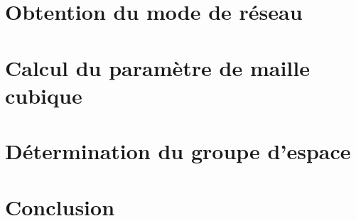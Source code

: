 \section{Obtention du mode de réseau}

\section{Calcul du paramètre de maille cubique}

\section{Détermination du groupe d'espace}

\section{Conclusion}

